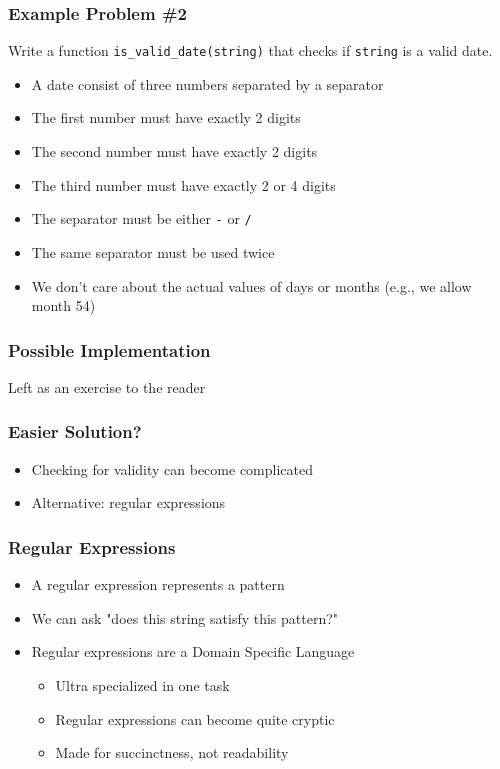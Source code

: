 \begin{frame}
  \frametitle{Example Problem \#2}
  \begin{center}
    Write a function \texttt{is\_valid\_date(string)} that checks if \texttt{string} is a valid date.
  \end{center}
  \vskip5mm
  \begin{itemize}
    \item A date consist of three numbers separated by a separator
    \item The first number must have exactly 2 digits
    \item The second number must have exactly 2 digits
    \item The third number must have exactly 2 or 4 digits
    \item The separator must be either \texttt{-} or \texttt{/}
    \item The same separator must be used twice
    \item We don't care about the actual values of days or months (e.g., we allow month 54)
  \end{itemize}
\end{frame}

\begin{frame}
  \frametitle{Possible Implementation}
  \begin{center}
    Left as an exercise to the reader
  \end{center}
\end{frame}

\begin{frame}
  \frametitle{Easier Solution?}
  \begin{itemize}
    \item Checking for validity can become complicated
    \item Alternative: regular expressions
  \end{itemize}
\end{frame}

\begin{frame}
  \frametitle{Regular Expressions}
  \begin{itemize}
    \item A regular expression represents a pattern
    \item We can ask "does this string satisfy this pattern?"
    \item Regular expressions are a Domain Specific Language
      \begin{itemize}
        \item Ultra specialized in one task
        \item Regular expressions can become quite cryptic
        \item Made for succinctness, not readability
      \end{itemize}
  \end{itemize}
\end{frame}

